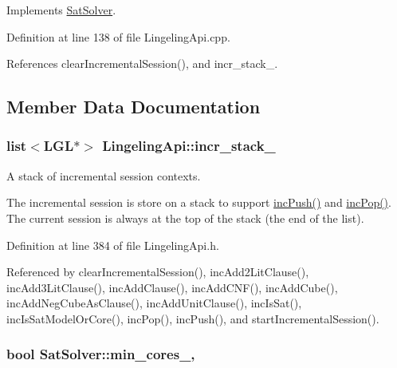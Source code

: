 Implements \hyperlink{classSatSolver_a74603f84c3f2383a5fc44d5a8093cbea}{Sat\-Solver}.



Definition at line 138 of file Lingeling\-Api.\-cpp.



References clear\-Incremental\-Session(), and incr\-\_\-stack\-\_\-.



\subsection{Member Data Documentation}
\hypertarget{classLingelingApi_af9b5703f6611337668def5aaf6be465a}{
\subsubsection[{incr\-\_\-stack\-\_\-}]{\setlength{\rightskip}{0pt plus 5cm}list$<$L\-G\-L$\ast$$>$ Lingeling\-Api\-::incr\-\_\-stack\-\_\-\hspace{0.3cm}{\ttfamily [protected]}}}\label{classLingelingApi_af9b5703f6611337668def5aaf6be465a}


A stack of incremental session contexts. 

The incremental session is store on a stack to support \hyperlink{classLingelingApi_a91c858d2a36a4fbe580909a793802a76}{inc\-Push()} and \hyperlink{classLingelingApi_afe43e1243338a332803fff470eedbf7a}{inc\-Pop()}. The current session is always at the top of the stack (the end of the list). 

Definition at line 384 of file Lingeling\-Api.\-h.



Referenced by clear\-Incremental\-Session(), inc\-Add2\-Lit\-Clause(), inc\-Add3\-Lit\-Clause(), inc\-Add\-Clause(), inc\-Add\-C\-N\-F(), inc\-Add\-Cube(), inc\-Add\-Neg\-Cube\-As\-Clause(), inc\-Add\-Unit\-Clause(), inc\-Is\-Sat(), inc\-Is\-Sat\-Model\-Or\-Core(), inc\-Pop(), inc\-Push(), and start\-Incremental\-Session().

\hypertarget{classSatSolver_adfeecebfd09606c82b5c57cfe5aad813}{
\subsubsection[{min\-\_\-cores\-\_\-}]{\setlength{\rightskip}{0pt plus 5cm}bool Sat\-Solver\-::min\-\_\-cores\-\_\-\hspace{0.3cm}{\ttfamily [protected]}, {\ttfamily [inherited]}}}\label{classSatSolver_adfeecebfd09606c82b5c57cfe5aad813}


